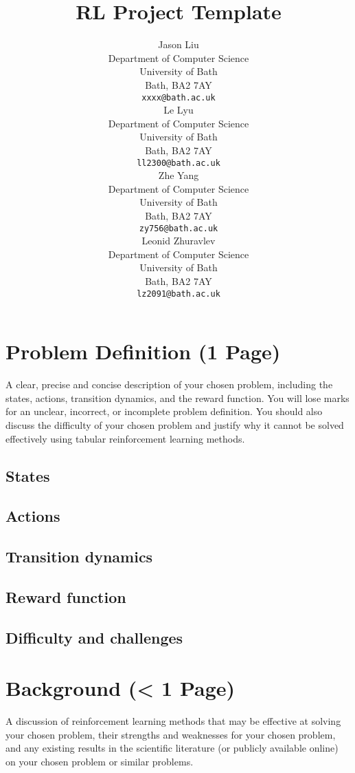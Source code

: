 \documentclass{article}
\title{RL Project Template}
\author{
  Jason Liu \\
  Department of Computer Science \\
  University of Bath \\
  Bath, BA2 7AY \\
  \texttt{xxxx@bath.ac.uk} \\
  \And
  Le Lyu \\
  Department of Computer Science \\
  University of Bath \\
  Bath, BA2 7AY \\
  \texttt{ll2300@bath.ac.uk} \\
  \And
  Zhe Yang \\
  Department of Computer Science \\
  University of Bath \\
  Bath, BA2 7AY \\
  \texttt{zy756@bath.ac.uk} \\
  \And
  Leonid Zhuravlev \\
  Department of Computer Science \\
  University of Bath \\
  Bath, BA2 7AY \\
  \texttt{lz2091@bath.ac.uk} \\
}
\begin{document}
\maketitle


\section{Problem Definition (1 Page)}
A clear, precise and concise description of your chosen problem, including the states, actions, transition dynamics, and the reward function. You will lose marks for an unclear, incorrect, or incomplete problem definition. You should also discuss
the difficulty of your chosen problem and justify why it cannot be solved effectively using tabular reinforcement learning methods.

\subsection{States}

\subsection{Actions}

\subsection{Transition dynamics}

\subsection{Reward function}

\subsection{Difficulty and challenges}



\section{Background (< 1 Page)}
A discussion of reinforcement learning methods that may be effective at solving your chosen problem, their strengths and weaknesses for your chosen problem, and any existing results in the scientific literature (or publicly available online) on your chosen problem or similar problems.
\end{document}
